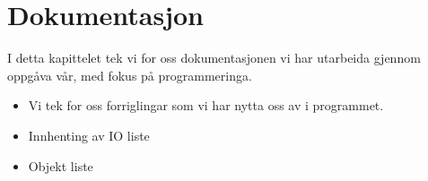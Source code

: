 \chapter{Dokumentasjon}
\thispagestyle{fancy}

I detta kapittelet tek vi for oss dokumentasjonen vi har utarbeida gjennom oppgåva vår, med fokus på programmeringa.
\begin{itemize}
    \item Vi tek for oss \gls{forrigling}ar som vi har nytta oss av i programmet.
    \item Innhenting av IO liste 
    \item Objekt liste
\end{itemize}

